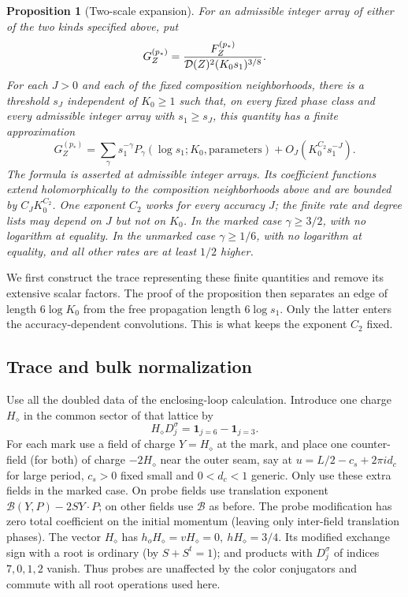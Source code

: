 \documentclass[11pt]{article}
\numberwithin{equation}{section}
\newtheorem{proposition}[theorem]{Proposition}
\theoremstyle{definition}\newtheorem{definition}[theorem]{Definition}
\theoremstyle{remark}\newtheorem{remark}[theorem]{Remark}
\begin{document}
\begin{proposition}[Two-scale expansion]\label{L:prop:two-scale}
For an admissible integer array of either of the two kinds specified
above, put
\[
 G_Z^{(p_*)}=\frac{F_Z^{(p_*)}}{{\cal D}(Z)^2(K_0s_1)^{3/8}}.
\]
For each $J>0$ and each of the fixed composition neighborhoods, there
is a threshold $s_J$ independent of $K_0\ge1$ such that, on every fixed
phase class and every admissible integer array with $s_1\ge s_J$,
this quantity has a finite approximation
\begin{equation}
 G_Z^{(p_*)}=
 \sum_\gamma s_1^{-\gamma}P_\gamma(\log s_1;K_0,\text{parameters})
       +O_J(K_0^{C_2}s_1^{-J}).\label{L:eq9}
\end{equation}
The formula is asserted at admissible integer arrays. Its coefficient
functions extend holomorphically to the composition neighborhoods above and
are bounded by $C_JK_0^{C_2}$. One exponent $C_2$ works for every accuracy $J$;
the finite rate and degree lists may depend on $J$ but not on $K_0$.
In the marked case $\gamma\ge3/2$, with no logarithm at equality.
In the unmarked case $\gamma\ge1/6$, with no logarithm at equality,
and all other rates are at least $1/2$ higher.
\end{proposition}

We first construct the trace representing these finite quantities and
remove its extensive scalar factors. The proof of the proposition then
separates an edge of length $6\log K_0$ from the free propagation length
$6\log s_1$. Only the latter enters the accuracy-dependent convolutions.
This is what keeps the exponent $C_2$ fixed.

\subsection{Trace and bulk normalization}\label{L:step14}

Use all the doubled data of the enclosing-loop calculation. Introduce one charge \(H_\diamond\) in the common sector of that lattice by
\[
 H_\diamond D_j^\sigma=\mathbf1_{j=6}-\mathbf1_{j=3}.
\]
For each mark use a field of charge \(Y=H_\diamond\) at the mark, and place one counter-field (for both) of charge \(-2H_\diamond\) near the outer seam, say at \(u=L/2-c_s+2\pi i d_c\) for large period, \(c_s>0\) fixed small and \(0<d_c<1\) generic. Only use these extra fields in the marked case. On probe fields use translation exponent \(\mathcal B(Y,P)-2SY\cdot P\); on other fields use \(\mathcal B\) as before. The probe modification has zero total coefficient on the initial momentum (leaving only inter-field translation phases). The vector \(H_\diamond\) has \(h_o H_\diamond=v H_\diamond=0,\ hH_\diamond=3/4\). Its modified exchange sign with a root is ordinary (by \(S+S^t=1\)); and products with \(D_j^\sigma\) of indices \(7,0,1,2\) vanish. Thus probes are unaffected by the color conjugators and commute with all root operations used here.
\end{document}
